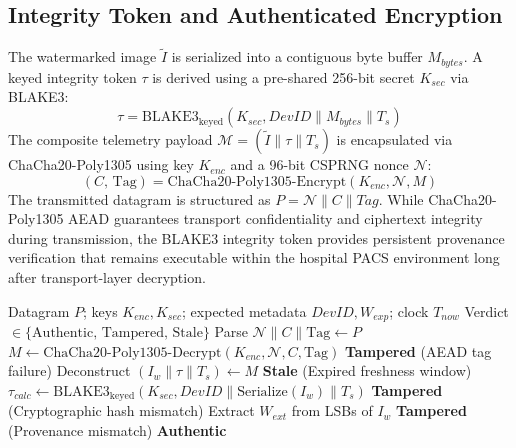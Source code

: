 \documentclass[runningheads]{llncs}
\begin{document}
\subsection{Integrity Token and Authenticated Encryption}
The watermarked image $\tilde{I}$ is serialized into a contiguous byte buffer $M_{bytes}$. A keyed integrity token $\tau$ is derived using a pre-shared 256-bit secret $K_{sec}$ via BLAKE3:
\begin{equation}
  \tau = \text{BLAKE3}_{\text{keyed}}(K_{sec}, DevID \parallel M_{bytes} \parallel T_s)
\end{equation}
The composite telemetry payload $\mathcal{M} = (\tilde{I} \parallel \tau \parallel T_s)$ is encapsulated via ChaCha20-Poly1305 using key $K_{enc}$ and a 96-bit CSPRNG nonce $\mathcal{N}$:
\begin{equation}
  (C,\,\text{Tag}) = \text{ChaCha20-Poly1305-Encrypt}(K_{enc},\mathcal{N},M)
\end{equation}
The transmitted datagram is structured as $P = \mathcal{N} \parallel C \parallel Tag$. While ChaCha20-Poly1305 AEAD guarantees transport confidentiality and ciphertext integrity during transmission, the BLAKE3 integrity token provides persistent provenance verification that remains executable within the hospital PACS environment long after transport-layer decryption.

\begin{algorithm}[htbp]
\caption{Receiver Verification and Provenance Extraction}
\label{alg:verification}
\begin{algorithmic}[1]
\Require Datagram $P$; keys $K_{enc}, K_{sec}$; expected metadata $DevID, W_{exp}$; clock $T_{now}$
\Ensure Verdict $\in \{\text{Authentic},\,\text{Tampered},\,\text{Stale}\}$
\State Parse $\mathcal{N} \parallel C \parallel \text{Tag} \gets P$
\State $M \gets \text{ChaCha20-Poly1305-Decrypt}(K_{enc}, \mathcal{N}, C, \text{Tag})$
 \Return \textbf{Tampered} (AEAD tag failure) \EndIf
\State Deconstruct $(I_w \parallel \tau \parallel T_s) \gets M$
 \Return \textbf{Stale} (Expired freshness window) \EndIf
\State $\tau_{\mathit{calc}} \gets \text{BLAKE3}_{\text{keyed}}(K_{sec}, DevID \parallel \text{Serialize}(I_w) \parallel T_s)$
 \Return \textbf{Tampered} (Cryptographic hash mismatch) \EndIf
\State Extract $W_{ext}$ from LSBs of $I_w$
 \Return \textbf{Tampered} (Provenance mismatch) \EndIf
\State \Return \textbf{Authentic}
\end{algorithmic}
\end{algorithm}
\end{document}
